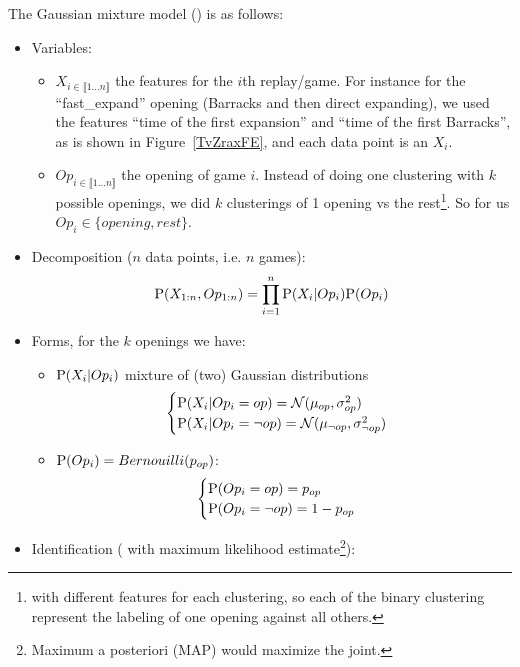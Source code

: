 \label{GMMEM}
The Gaussian mixture model () is as follows:
\begin{itemize}
    \item Variables:
    \begin{itemize}
        \item $X_{i \in \llbracket 1 \dots n\rrbracket}$ the features for the $i$th replay/game. For instance for the ``fast\_expand'' opening (Barracks and then direct expanding), we used the features ``time of the first expansion'' and ``time of the first Barracks'', as is shown in Figure~\ref{TvZraxFE}, and each data point is an $X_i$.
        \item $Op_{i \in \llbracket1 \dots n\rrbracket}$ the opening of game $i$. Instead of doing one clustering with $k$ possible openings, we did $k$ clusterings of 1 opening vs the rest\footnote{with different features for each clustering, so each of the binary clustering represent the labeling of one opening against all others.}. So for us $Op_i \in \{opening, rest\}$.
    \end{itemize}
    \item Decomposition ($n$ data points, i.e. $n$ games):
$$\mathrm{P}(X_{1:n}, Op_{1:n}) = \prod_{i=1}^n \mathrm{P}(X_i|Op_i)\mathrm{P}(Op_i)$$
    \item Forms, for the $k$ openings we have:
    \begin{itemize}
        \item $\mathrm{P}(X_i|Op_i)$ mixture of (two) Gaussian distributions
        \begin{eqnarray*}
            \begin{cases} \mathrm{P}(X_i|Op_i=op) = \mathcal{N}(\mu_{op}, \sigma_{op}^2)\\
            \mathrm{P}(X_i|Op_i=\neg op) = \mathcal{N}(\mu_{\neg op}, \sigma_{\neg op}^2) \end{cases} 
        \end{eqnarray*}
        \item $\mathrm{P}(Op_i) = Bernouilli(p_{op})$: 
        \begin{eqnarray*}
            \begin{cases} \mathrm{P}(Op_i=op) = p_{op}\\
            \mathrm{P}(Op_i=\neg op) = 1-p_{op} \end{cases}
        \end{eqnarray*}
    \end{itemize}
    \item Identification ( with maximum likelihood estimate\footnote{Maximum a posteriori (MAP) would maximize the joint.}):\\

\end{itemize}
